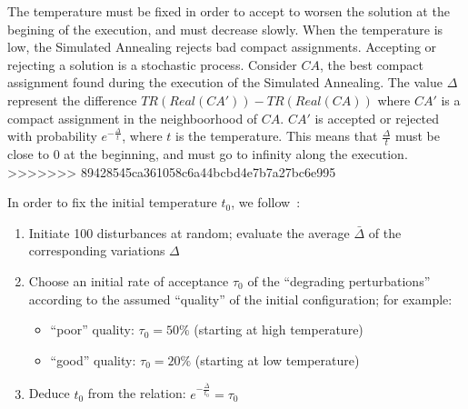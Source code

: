  The temperature must be fixed in order to accept to worsen the solution at the begining of the execution, and must decrease slowly. When the temperature is low, the Simulated Annealing rejects bad compact assignments.
 Accepting or rejecting a solution is a stochastic process. Consider $CA$, the best compact assignment found during the execution of the Simulated Annealing. The value $\Delta$ represent the difference $TR(Real(CA'))-TR(Real(CA))$ where $CA'$ is a compact assignment in the neighboorhood of $CA$. $CA'$ is accepted or rejected with probability $e^{-\frac{\Delta}{t}} $, where $t$ is the temperature.
 This means that $\frac{\Delta}{t}$ must be close to $0$ at the beginning, and must go to infinity along the execution. 
>>>>>>> 89428545ca361058c6a44bcbd4e7b7a27bc6e995
 
 In order to fix the initial temperature $t_0$, we follow~\cite{osman1997meta}:
 \begin{enumerate}
  \item Initiate 100 disturbances at random; evaluate the average $\bar{\Delta}$ of the corresponding variations $\Delta$
\item Choose an initial rate of acceptance $\tau_0$ of the “degrading perturbations” according to the assumed “quality” of the initial configuration; for example:
\begin{itemize}
 \item “poor” quality: $\tau_0 = 50 \%$ (starting at high temperature)
\item “good” quality: $\tau_0 = 20 \%$ (starting at low temperature)
\end{itemize}


\item Deduce $t_0$ from the relation: $e^{-\frac{\bar{\Delta}}{t_0}} = \tau_0$ 
 \end{enumerate}
 
